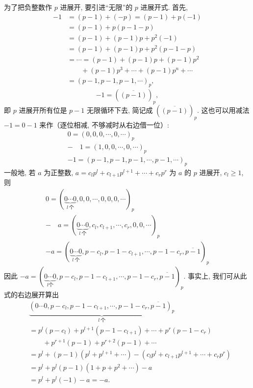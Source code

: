 为了把负整数作 $p$ 进展开, 要引进``无限''的 $p$ 进展开式. 首先,
\begin{align*}
  -1&=(p-1)+(-p)=(p-1)+p(-1)\\
  &=(p-1)+p(p-1-p)\\
  &=(p-1)+(p-1)p+p^2(-1)\\
  &=(p-1)+(p-1)p+p^2(p-1-p)\\
  &=\cdots=(p-1)+(p-1)p+(p-1)p^2\\
  &\qquad+(p-1)p^3+\cdots+(p-1)p^n+\cdots\\
  &=(p-1,p-1,p-1,\cdots)_p,
\end{align*}
\begin{equation}\tag{1}
  -1=(\overline{(p-1)})_p,
\end{equation}
即 $p$ 进展开所有位是 $p-1$ 无限循环下去, 简记成 $(\overline{(p-1)})_p$. 这也可以用减法 $-1=0-1$ 来作（逐位相减, 不够减时从右边借一位）:
\[
  \begin{array}{r}
    0=(0,0,0,\cdots,0,\cdots)_p\\
    -\quad 1=(1,0,0,\cdots,0,\cdots)_p\\
    \hline
    -1=(p-1,p-1,p-1,\cdots,p-1,\cdots)_p
  \end{array}
\]
一般地, 若 $a$ 为正整数, $a=c_lp^l+c_{l+1}p^{l+1}+\cdots+c_rp^r$ 为 $a$ 的 $p$ 进展开, $c_l\geqslant 1$, 则
\[
  \begin{array}{r}
    0=(\underbrace{0\cdots 0}_{l\ \text{个}},0,0,\cdots,0,0,0,\cdots)_p\\
    -\quad a=(\underbrace{0\cdots 0}_{l\ \text{个}},c_l,c_{l+1},\cdots,c_r,0,0,\cdots)_p\\
    \hline
    -a=(\underbrace{0\cdots 0}_{l\ \text{个}},p-c_l,p-1-c_{l+1},\cdots,p-1-c_r,\overline{p-1})_p
  \end{array}
\]
因此 $-a=(\underbrace{0\cdots 0}_{l\text{个}},p-c_l,p-1-c_{l+1},\cdots,p-1-c_r,\overline{p-1})_p$. 事实上, 我们可从此式的右边展开算出
\begin{align*}
  &\underbrace{(0\cdots 0,p-c_l,p-1-c_{l+1},\cdots,p-1-c_r,\overline{p-1})_p}_{l\ \text{个}}\\
  &=p^l(p-c_l)+p^{l+1}(p-1-c_{l+1})+\cdots+p^r(p-1-c_r)\\
  &\qquad+p^{r+1}(p-1)+p^{r+2}(p-1)+\cdots\\
  &=p^l+(p-1)(p^l+p^{l+1}+\cdots)-(c_lp^l+c_{l+1}p^{l+1}+\cdots+c_rp^r)\\
  &=p^l+p^l(p-1)(1+p+p^2+\cdots)-a\\
  &=p^l+p^l(-1)-a=-a.
\end{align*}

